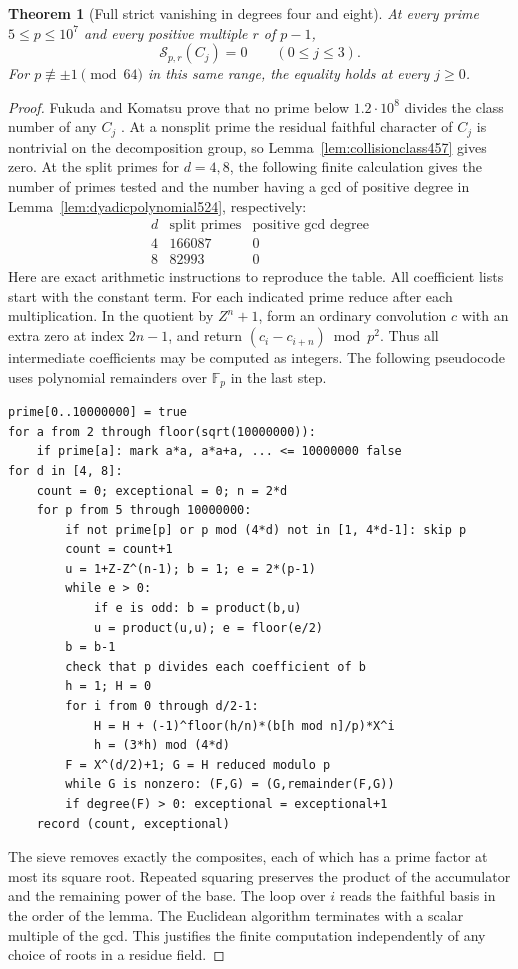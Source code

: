 \documentclass[a4paper,11pt]{article}
\newtheorem{theorem}[proposition]{Theorem}
\theoremstyle{definition}
\theoremstyle{remark}
\numberwithin{equation}{section}
\begin{document}
\begin{theorem}[Full strict vanishing in degrees four and eight]
\leavevmode\label{thm:octicrange524}
At every prime \(5\le p\le10^7\) and every positive multiple \(r\)
of \(p-1\),
\[
           \mathcal S_{p,r}(C_j)=0\qquad(0\le j\le3).
\]
For \(p\not\equiv\pm1\pmod{64}\) in this same range, the equality
holds at every \(j\ge0\).
\end{theorem}
\begin{proof}
Fukuda and Komatsu prove that no prime below \(1.2\cdot10^8\)
divides the class number of any \(C_j\)
\cite[Corollary 1.1]{XI-VIII-weberFK524}. At a nonsplit prime the residual
faithful character of \(C_j\) is nontrivial on the decomposition
group, so Lemma~\ref{lem:collisionclass457} gives zero. At the split
primes for \(d=4,8\), the following finite calculation gives the
number of primes tested and the number having a gcd of positive
degree in Lemma~\ref{lem:dyadicpolynomial524}, respectively:
\[
\begin{array}{c|rr}
 d&\text{split primes}&\text{positive gcd degree}\\ \hline
 4&166087&0\\
 8&82993&0
\end{array}
\]
Here are exact arithmetic instructions to reproduce the table. All
coefficient lists start with the constant term. For each indicated
prime reduce after each multiplication. In the quotient by
\(Z^n+1\), form an ordinary convolution \(c\) with an extra zero
at index \(2n-1\), and return \((c_i-c_{i+n})\bmod p^2\). Thus all
intermediate coefficients may be computed as integers. The following
pseudocode uses polynomial remainders over \(\mathbb F_p\) in the
last step.
\begin{verbatim}
prime[0..10000000] = true
for a from 2 through floor(sqrt(10000000)):
    if prime[a]: mark a*a, a*a+a, ... <= 10000000 false
for d in [4, 8]:
    count = 0; exceptional = 0; n = 2*d
    for p from 5 through 10000000:
        if not prime[p] or p mod (4*d) not in [1, 4*d-1]: skip p
        count = count+1
        u = 1+Z-Z^(n-1); b = 1; e = 2*(p-1)
        while e > 0:
            if e is odd: b = product(b,u)
            u = product(u,u); e = floor(e/2)
        b = b-1
        check that p divides each coefficient of b
        h = 1; H = 0
        for i from 0 through d/2-1:
            H = H + (-1)^floor(h/n)*(b[h mod n]/p)*X^i
            h = (3*h) mod (4*d)
        F = X^(d/2)+1; G = H reduced modulo p
        while G is nonzero: (F,G) = (G,remainder(F,G))
        if degree(F) > 0: exceptional = exceptional+1
    record (count, exceptional)
\end{verbatim}
The sieve removes exactly the composites, each of which has a prime
factor at most its square root. Repeated squaring preserves the
product of the accumulator and the remaining power of the base.
The loop over \(i\) reads the faithful basis in the order of the
lemma. The Euclidean algorithm terminates with a scalar multiple of
the gcd. This justifies the finite computation independently of any
choice of roots in a residue field.


\end{proof}
\end{document}

